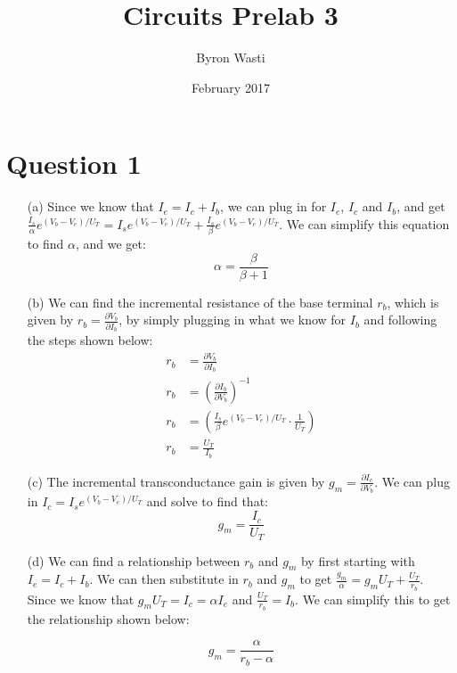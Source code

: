 \documentclass{article}
\title{Circuits Prelab 3}
\author{Byron Wasti}
\date{February 2017}
\begin{document}
\maketitle

\section{Question 1}
\begin{itemize}
    \item [(a)] 
        Since we know that $I_e = I_c + I_b$, we can plug in for $I_e$, $I_c$ and $I_b$, and get $\frac{I_s}{\alpha}e^{(V_b - V_e)/U_T} = I_se^{(V_b - V_e)/U_T} + \frac{I_s}{\beta}e^{(V_b - V_e)/U_T}$. We can simplify this equation to find $\alpha$, and we get:
        \begin{equation*}
            \alpha = \frac{\beta}{\beta + 1}
        \end{equation*}

    \item [(b)]
        We can find the incremental resistance of the base terminal $r_b$, which is given by $r_b = \frac{\partial V_b}{\partial I_b}$, by simply plugging in what we know for $I_b$ and following the steps shown below:
        \begin{align*}
            r_b &= \frac{\partial V_b}{\partial I_b}\\
            r_b &= \left(\frac{\partial I_b}{\partial V_b}\right)^{-1}\\
            r_b &= \left( \frac{I_s}{\beta}e^{(V_b - V_e)/U_T}\cdot \frac{1}{U_T} \right)\\
            r_b &= \frac{U_T}{I_b}
        \end{align*}

    \item [(c)]
        The incremental transconductance gain is given by $g_m = \frac{ \partial I_c }{ \partial V_b }$. We can plug in $I_c = I_se^{(V_b - V_e)/U_T}$ and solve to find that:
        \begin{equation*}
            g_m = \frac{ I_c }{ U_T }
        \end{equation*}

    \item [(d)]
        We can find a relationship between $r_b$ and $g_m$ by first starting with $I_e = I_c + I_b$. We can then substitute in $r_b$ and $g_m$ to get $\frac{g_m}{\alpha} = g_mU_T + \frac{U_T}{r_b}$. Since we know that $g_mU_T = I_c = \alpha I_e$ and $\frac{U_T}{r_b} = I_b$. We can simplify this to get the relationship shown below:
        
        \begin{equation*}
            g_m = \frac{\alpha}{r_b - \alpha}
        \end{equation*}

\end{itemize}
\end{document}
